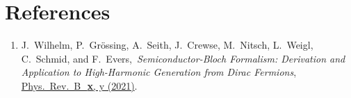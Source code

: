 \documentclass[11pt, a4paper, openany]{scrartcl}
\newcommand{\paper}[4]{\item #1, \,\textit{#2}, \,\href{#3}{#4}.\\[-1.4em]}
\begin{document}
\section{References}
\begin{enumerate}[leftmargin=*]

\paper{J.~Wilhelm, P.~Grössing, A.~Seith, J.~Crewse, M.~Nitsch, L.~Weigl, C.~Schmid, and F.~Evers}{Semi\-con\-duc\-tor-Bloch Formalism: Derivation and Application to High-Harmonic Generation from Dirac Fermions}{TOBEFILLED}{ 
Phys.~Rev.~B~\,\textbf{x}, y (2021)}
\label{Wilhelm2021}

\end{enumerate}
\end{document}
